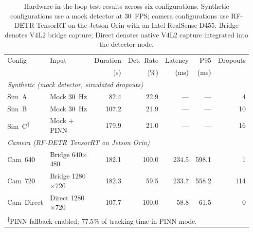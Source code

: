 \begin{table}[htbp]
\centering
\caption{Hardware-in-the-loop test results across six configurations. Synthetic configurations use a mock detector at 30~FPS; camera configurations use RF-DETR TensorRT on the Jetson Orin with an Intel RealSense D455. Bridge denotes V4L2 bridge capture; Direct denotes native V4L2 capture integrated into the detector node.}
\label{tab:hitl}
\begin{tabular}{llrrrrr}
\toprule
Config & Input & Duration & Det.\ Rate & Latency & P95 & Dropouts \\
 & & (s) & (\%) & (ms) & (ms) & \\
\midrule
\multicolumn{7}{l}{\textit{Synthetic (mock detector, simulated dropouts)}} \\
Sim~A   & Mock 30~Hz     &  82.4 & 22.9 & ---   & --- & 4  \\
Sim~B   & Mock 30~Hz     & 107.2 & 21.9 & ---   & --- & 10 \\
Sim~C\textsuperscript{$\dagger$}  & Mock + PINN    & 179.9 & 21.0 & ---   & --- & 16 \\
\midrule
\multicolumn{7}{l}{\textit{Camera (RF-DETR TensorRT on Jetson Orin)}} \\
Cam~640   & Bridge 640$\times$480  & 182.1 & 100.0 & 234.5 & 598.1 & 1  \\
Cam~720   & Bridge 1280$\times$720 & 182.3 &  59.5 & 233.7 & 558.2 & 114 \\
Cam~Direct & Direct 1280$\times$720 & 107.7 & 100.0 &  58.8 &  61.5 & 0 \\
\bottomrule
\multicolumn{7}{l}{\footnotesize\textsuperscript{$\dagger$}PINN fallback enabled; 77.5\% of tracking time in PINN mode.} \\
\end{tabular}
\end{table}
